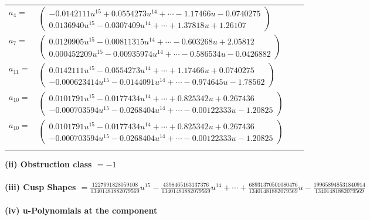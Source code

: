 \documentclass[1p]{elsarticle_modified}
\theoremstyle{definition}
\begin{document}
\begin{tabular}{m{7pt} m{180pt} m{7pt} m{180pt} }
\flushright $a_{4}=$&$\begin{pmatrix}-0.0142111 u^{15}+0.0554273 u^{14}+\cdots-1.17466 u-0.0740275\\0.0136940 u^{15}-0.0307409 u^{14}+\cdots+1.37818 u+1.26107\end{pmatrix}$ \\
\flushright $a_{7}=$&$\begin{pmatrix}0.0120905 u^{15}-0.00811315 u^{14}+\cdots-0.603268 u+2.05812\\0.000452209 u^{15}-0.00935974 u^{14}+\cdots-0.586534 u-0.0426882\end{pmatrix}$ \\
\flushright $a_{11}=$&$\begin{pmatrix}0.0142111 u^{15}-0.0554273 u^{14}+\cdots+1.17466 u+0.0740275\\-0.000623414 u^{15}-0.0144091 u^{14}+\cdots-0.974645 u-1.78562\end{pmatrix}$ \\
\flushright $a_{10}=$&$\begin{pmatrix}0.0101791 u^{15}-0.0177434 u^{14}+\cdots+0.825342 u+0.267436\\-0.000703594 u^{15}-0.0268404 u^{14}+\cdots-0.00122333 u-1.20825\end{pmatrix}$\\ \flushright $a_{10}=$&$\begin{pmatrix}0.0101791 u^{15}-0.0177434 u^{14}+\cdots+0.825342 u+0.267436\\-0.000703594 u^{15}-0.0268404 u^{14}+\cdots-0.00122333 u-1.20825\end{pmatrix}$\\&\end{tabular}
\flushleft \textbf{(ii) Obstruction class $= -1$}\\~\\
\flushleft \textbf{(iii) Cusp Shapes $= \frac{1227691828059108}{13401481882079569} u^{15}-\frac{4398465163137376}{13401481882079569} u^{14}+\cdots+\frac{68931370501080476}{13401481882079569} u-\frac{199658948531840914}{13401481882079569}$}\\~\\
\newpage\renewcommand{\arraystretch}{1}
\flushleft \textbf{(iv) u-Polynomials at the component}\newline \\
\end{document}
